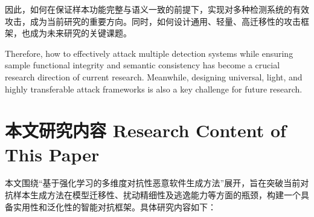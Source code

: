 因此，如何在保证样本功能完整与语义一致的前提下，实现对多种检测系统的有效攻击，成为当前研究的重要方向。同时，如何设计通用、轻量、高迁移性的攻击框架，也成为未来研究的关键课题。

Therefore, how to effectively attack multiple detection systems while ensuring sample functional integrity and semantic consistency has become a crucial research direction of current research. Meanwhile, designing universal, light, and highly transferable attack frameworks is also a key challenge for future research.

\section{本文研究内容 Research Content of This Paper}

本文围绕“基于强化学习的多维度对抗性恶意软件生成方法”展开，旨在突破当前对抗样本生成方法在模型迁移性、扰动精细性及逃逸能力等方面的瓶颈，构建一个具备实用性和泛化性的智能对抗框架。具体研究内容如下：

